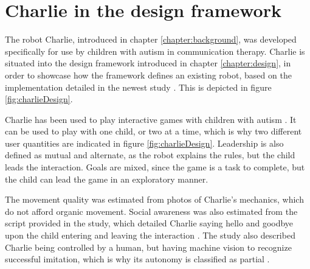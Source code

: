

\chapter{Charlie in the design framework}
\label{chapter:charlieDesign}

The robot Charlie, introduced in chapter \ref{chapter:background}, was developed specifically for use by children with autism in communication therapy. Charlie is situated into the design framework introduced in chapter \ref{chapter:design}, in order to showcase how the framework defines an existing robot, based on the implementation detailed in the newest study \cite{boccanfuso2017low}. This is depicted in figure \ref{fig:charlieDesign}.

Charlie has been used to play interactive games with children with autism \cite{charlie2011, boccanfuso2017low}. It can be used to play with one child, or two at a time, which is why two different user quantities are indicated in figure \ref{fig:charlieDesign}. Leadership is also defined as mutual and alternate, as the robot explains the rules, but the child leads the interaction. Goals are mixed, since the game is a task to complete, but the child can lead the game in an exploratory manner.

The movement quality was estimated from photos of Charlie's mechanics, which do not afford organic movement. Social awareness was also estimated from the script provided in the study, which detailed Charlie saying hello and goodbye upon the child entering and leaving the interaction \cite{boccanfuso2017low}. The study also described Charlie being controlled by a human, but having machine vision to recognize successful imitation, which is why its autonomy is classified as partial \cite{boccanfuso2017low}.

